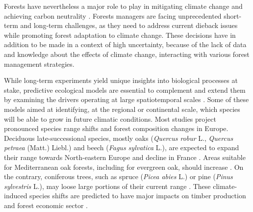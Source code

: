 \documentclass[letterpaper,8pt]{extarticle}  %
\begin{document}
\begin{doublespacing}
\begin{linenumbers}
Forests have nevertheless a major role to play in mitigating climate change and achieving carbon neutrality \citep{Korosuo2023, Hyyrynen2023}. Forests managers are facing unprecedented short-term and long-term challenges, as they need to address current dieback issues while promoting forest adaptation to climate change. These decisions have in addition to be made in a context of high uncertainty, because of the lack of data and knowledge about the effects of climate change, interacting with various forest management strategies.

While long-term experiments yield unique insights into biological processes at stake, predictive ecological models are essential to complement and extend them by examining the drivers operating at large spatiotemporal scales \citep{Levins1993, Mitchell2006}. Some of these models aimed at identifying, at the regional or continental scale, which species will be able to grow in future climatic conditions. Most studies project pronounced species range shifts and forest composition changes in Europe. Deciduous late-successional species, mostly oaks (\emph{Quercus robur} L., \emph{Quercus petraea} (Matt.) Liebl.) and beech (\emph{Fagus sylvatica} L.), are expected to expand their range towards North-eastern Europe and decline in France \citep{Hickler2012, Hanewinkel2013, Saltre2015, Schueler2014, Dyderski2018, Takolander2019, Wessely2024}. Areas suitable for Mediterranean oak forests, including for evergreen oak, should increase \citep{Ohlemueller2006, Hanewinkel2013, Takolander2019}. On the contrary, coniferous trees, such as spruce (\emph{Picea abies} L.) or pine (\emph{Pinus sylvestris} L.), may loose large portions of their current range \citep{Hanewinkel2013, Schueler2014, Wessely2024}. These climate-induced species shifts are predicted to have major impacts on timber production and forest economic sector \citep{Hanewinkel2013, Wessely2024}. 


\end{linenumbers}
\end{doublespacing}
\end{document}
